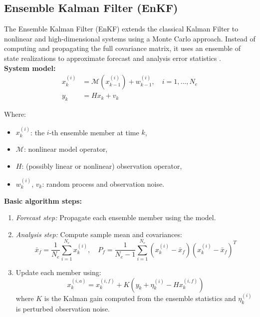 \documentclass[a4paper]{article}
\begin{document}
\subsection{Ensemble Kalman Filter (EnKF)}

The Ensemble Kalman Filter (EnKF) extends the classical Kalman Filter to nonlinear and high-dimensional systems 
using a Monte Carlo approach. Instead of computing and propagating the full covariance matrix, it uses an ensemble 
of state realizations to approximate forecast and analysis error statistics \parencite{evensen1994sequential, houtekamer2005ensemble}.\\

\textbf{System model:}\\

\begin{align}
x_k^{(i)} &= \mathcal{M}(x_{k-1}^{(i)}) + w_{k-1}^{(i)}, \quad i = 1, ..., N_e \\
y_k &= H x_k + v_k
\end{align}

Where:\\

\begin{itemize}
  \item $x_k^{(i)}$: the $i$-th ensemble member at time $k$,
  \item $\mathcal{M}$: nonlinear model operator,
  \item $H$: (possibly linear or nonlinear) observation operator,
  \item $w_k^{(i)}$, $v_k$: random process and observation noise.
\end{itemize}

\textbf{Basic algorithm steps:}\\

\begin{enumerate}
  \item \textit{Forecast step:} Propagate each ensemble member using the model.
  \item \textit{Analysis step:} Compute sample mean and covariances:
    \[
    \bar{x}_f = \frac{1}{N_e} \sum_{i=1}^{N_e} x_k^{(i)}, \quad
    P_f = \frac{1}{N_e - 1} \sum_{i=1}^{N_e} (x_k^{(i)} - \bar{x}_f)(x_k^{(i)} - \bar{x}_f)^T
    \]
  \item Update each member using:
    \[
    x_k^{(i,a)} = x_k^{(i,f)} + K \left( y_k + \eta_k^{(i)} - H x_k^{(i,f)} \right)
    \]
    where $K$ is the Kalman gain computed from the ensemble statistics and $\eta_k^{(i)}$ is perturbed observation noise.
\end{enumerate}
\end{document}
